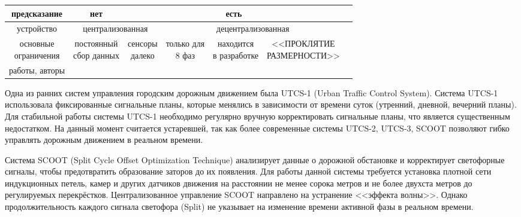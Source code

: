 \documentclass[11pt]{ubs}
\begin{document}
\begin{table}[h!]
{\begin{tabular}{|c||c|c|c|c|c|c|}
      предсказание      & нет                                   & \multicolumn{4}{c|}{есть}                                                                       \\ \hline
      устройство        & \multicolumn{2}{c|}{централизованная} & \multicolumn{3}{c|}{децентрализованная}                                                                                                                                                    \\ \hline
      \parbox{0.2\textwidth}{\centering\rule{0em}{1.2em}основные                                                                                                                                                                                             \\ограничения\rule[-0.5em]{0em}{1.2em}}   & \parbox{0.2\textwidth}{\centering\rule{0em}{1.2em}постоянный\\сбор данных} & \parbox{0.15\textwidth}{\centering \rule{0em}{1.2em}сенсоры \\далеко} & \parbox{0.2\textwidth}{\centering \rule{0em}{1.2em}только для\\  8 фаз}&  \parbox{0.2\textwidth}{\centering \rule{0em}{1.2em}находится \\в разработке} & \parbox{0.25\textwidth}{\centering <<ПРОКЛЯТИЕ\\РАЗМЕРНОСТИ>>} \\ \hline
      работы, авторы &&&&&\\\hline
    \end{tabular}
  }
\end{table}


Одна из ранних систем управления городским дорожным движением была UTCS-1 (Urban Traffic Control System)\cite{carini1977}. Система UTCS-1 использовала фиксированные сигнальные планы, которые менялись в зависимости от времени суток (утренний, дневной, вечерний планы). Для стабильной работы системы UTCS-1 необходимо  регулярно вручную корректировать сигнальные планы, что является существенным недостатком. На данный момент считается устаревшей, так как более современные системы UTCS-2, UTCS-3, SCOOT позволяют гибко управлять дорожным движением в реальном времени.

Система SCOOT (Split Cycle Offset Optimization Technique)\cite{chandler1985} анализирует данные о дорожной обстановке и корректирует светофорные сигналы, чтобы предотвратить образование заторов до их появления. Для работы данной системы требуется установка плотной сети индукционных петель, камер и других датчиков движения на расстоянии не менее  сорока метров и не более двухста метров до регулируемых перекрёстков. Централизованное управление SCOOT направлено на устранение <<эффекта волны>>. Однако продолжительность каждого сигнала светофора (Split) не указывает на изменение времени активной фазы в реальном времени.
\end{document}
